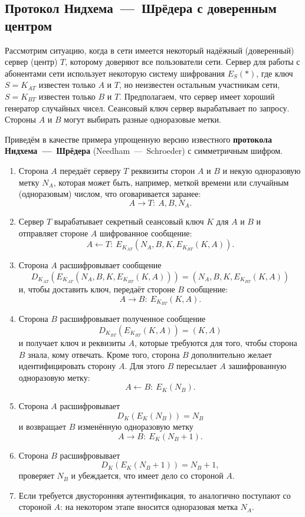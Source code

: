 \subsection{Протокол Нидхема~---~Шрёдера с доверенным центром}

Рассмотрим ситуацию, когда в сети имеется некоторый надёжный (доверенный) сервер (центр) $T$, которому доверяют все пользователи сети. Сервер для работы с абонентами сети использует некоторую систему шифрования $E_S(*)$, где ключ $S=K_{AT}$  известен только $A$ и $T$, но неизвестен остальным участникам сети, $S = K_{BT}$ известен только $B$ и  $T$. Предполагаем, что сервер имеет хороший генератор случайных чисел. Сеансовый ключ сервер вырабатывает по запросу. Стороны $A$ и $B$ могут выбирать разные одноразовые метки.

Приведём в качестве примера упрощенную версию известного \textbf{протокола Нидхема~---~Шрёдера} (Needham~---~Schroeder) с симметричным шифром.
\begin{enumerate}
    \item Сторона $A$ передаёт серверу $T$ реквизиты сторон $A$ и $B$  и некую одноразовую метку $N_A$, которая может быть, например, меткой времени или случайным (одноразовым) числом, что оговаривается заранее:
            \[ A \rightarrow T: ~ A, B, N_A. \]
    \item Сервер $T$ вырабатывает секретный сеансовый ключ $K$ для $A$ и $B$ и отправляет стороне $A$ шифрованное сообщение:
            \[ A \leftarrow T: ~ E_{K_{AT}}(N_A, B, K, E_{K_{BT}}(K, A)). \]
    \item Сторона $A$ расшифровывает сообщение
            \[ D_{K_{AT}}( E_{K_{AT}}(N_A, B, K, E_{K_{BT}}(K, A))) = (N_A, B, K, E_{K_{BT}}(K, A)) \]
        и, чтобы доставить ключ, передаёт стороне $B$ сообщение:
            \[ A \rightarrow B: ~ E_{K_{BT}}(K, A). \]
    \item Сторона $B$ расшифровывает полученное сообщение
            \[ D_{K_{BT}}( E_{K_{BT}}( K,A)) = (K,A) \]
        и получает ключ и реквизиты $A$, которые требуются для того, чтобы сторона $B$ знала, кому отвечать. Кроме того, сторона $B$ дополнительно желает идентифицировать сторону $A$. Для этого $B$ пересылает $A$ зашифрованную одноразовую метку:
            \[ A \leftarrow B: ~ E_{K}(N_B). \]
    \item Сторона $A$ расшифровывает
            \[ D_K( E_K( N_B)) = N_B \]
        и возвращает $B$ изменённую одноразовую метку
            \[ A \rightarrow B: ~ E_K(N_B + 1). \]
    \item Сторона $B$ расшифровывает
            \[ D_K( E_K( N_B + 1)) = N_B + 1, \]
        проверяет $N_B$ и убеждается, что имеет дело со стороной $A$.
    \item Если требуется двусторонняя аутентификация, то аналогично поступают со стороной $A$: на некотором этапе вносится одноразовая метка $N_A$.
\end{enumerate}
